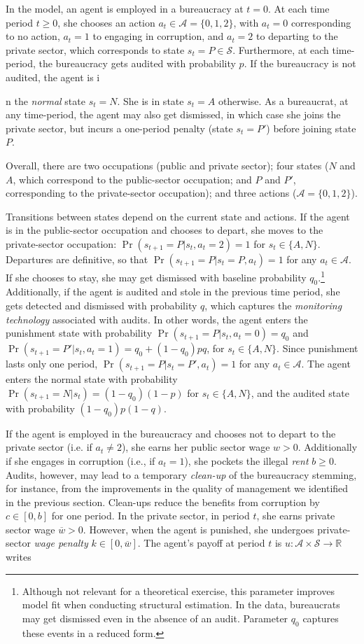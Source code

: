 \documentclass[12pt,a4paper]{article}
\theoremstyle{definition}
\newcommand{\wb}{\overline{w}}
\newcommand{\St}{\mathcal{S}}
\newcommand{\A}{\mathcal{A}}
\begin{document}
In the model, an agent is employed in a bureaucracy at $t = 0$. At each time period $t \geq 0$, she chooses an action $a_t \in \A = \{0,1,2\}$, with $a_t = 0$ corresponding to no action, $a_t = 1$ to engaging in corruption, and $a_t = 2$ to departing to the private sector, which corresponds to state $s_t = P \in \St$. Furthermore, at each time-period, the bureaucracy gets audited with probability $p$. If the bureaucracy is not audited, the agent is i{n the \emph{normal} state $s_t = N$. She is in state $s_t = A$ otherwise. As a bureaucrat, at any time-period, the agent may also get dismissed, in which case she joins the private sector, but incurs a one-period penalty (state $s_t = P'$) before joining state $P$. 

Overall, there are two occupations (public and private sector); four states ($N$ and $A$, which correspond to the public-sector occupation; and $P$ and $P'$, corresponding to the private-sector occupation); and three actions ($\A = \{0,1,2\}$). 

Transitions between states depend on the current state and actions. If the agent is in the public-sector occupation and chooses to depart, she moves to the private-sector occupation: $\Pr(s_{t+1} = P | s_t, a_t = 2) = 1$ for $s_t \in \{A, N\}$. Departures are definitive, so that $\Pr(s_{t+1} = P | s_t = P, a_t) = 1$ for any $a_t \in \A$. If she chooses to stay, she may get dismissed with baseline probability $q_0$.\footnote{Although not relevant for a theoretical exercise, this parameter improves model fit when conducting structural estimation. In the data, bureaucrats may get dismissed even in the absence of an audit. Parameter $q_0$ captures these events in a reduced form.} Additionally, if the agent is audited and stole in the previous time period, she gets detected and dismissed with probability $q$, which captures the \emph{monitoring technology} associated with audits. In other words, the agent enters the punishment state with probability $\Pr(s_{t+1} = P | s_t, a_t = 0) = q_0$ and $\Pr(s_{t+1} = P' | s_t, a_t = 1) = q_0 + (1-q_0) p q$, for $s_t \in \{A, N\}$. Since punishment lasts only one period, $\Pr(s_{t+1} = P | s_t = P', a_t) = 1$ for any $a_t \in \A$. The agent enters the normal state with probability $\Pr(s_{t+1} = N | s_t) = (1-q_0)(1-p)$ for $s_t \in \{A,N\}$, and the audited state with probability $(1-q_0)p(1-q)$.

If the agent is employed in the bureaucracy and chooses not to depart to the private sector (i.e. if $a_t \neq 2$), she earns her public sector wage $w > 0$. Additionally if she engages in corruption (i.e., if $a_t = 1$), she pockets the illegal \emph{rent} $b \geq 0$. Audits, however, may lead to a temporary \emph{clean-up} of the bureaucracy stemming, for instance, from the improvements in the quality of management we identified in the previous section. Clean-ups reduce the benefits from corruption by $c \in [0,b]$ for one period. In the private sector, in period $t$, she earns private sector wage $\wb > 0$. However, when the agent is punished, she undergoes private-sector \emph{wage penalty} $k \in [0, \wb]$. The agent's payoff at period $t$ is $u : \A \times \St \rightarrow \mathbb{R}$ writes

}
\end{document}
